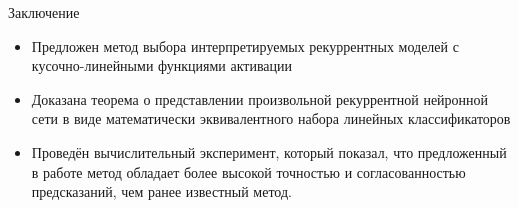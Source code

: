 \documentclass{beamer}
\begin{document}
\begin{frame}{Заключение}
    \begin{itemize}
        \item Предложен метод выбора интерпретируемых рекуррентных моделей с кусочно-линейными функциями активации
        \item Доказана теорема о представлении произвольной рекуррентной нейронной сети в виде математически эквивалентного набора линейных классификаторов
        \item Проведён вычислительный эксперимент, который показал, что предложенный в работе метод обладает более высокой точностью и согласованностью предсказаний, чем ранее известный метод.
    \end{itemize}
\end{frame}
\end{document}
